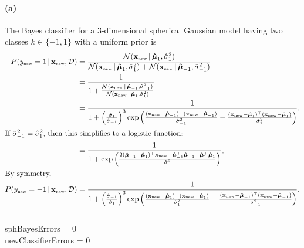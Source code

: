 \documentclass[a4paper,11pt]{article}
\DeclareMathOperator{\given}{\mid}
\begin{document}
\paragraph{(a)}
The Bayes classifier for a 3-dimensional spherical Gaussian model having two classes $k\in\{-1,1\}$ with a uniform prior is
\begin{align*}
  P( y_\mathrm{\scriptscriptstyle{new}}=1
    \given \mathbf{x}_\mathrm{\scriptscriptstyle{new}}, \mathcal{D})
  &=
  \frac{
    \mathcal{N}( \mathbf{x}_\mathrm{\scriptscriptstyle{new}}
      \given \boldsymbol{\hat\mu}_1, \hat\sigma_1^2)
  }{
    \mathcal{N}( \mathbf{x}_\mathrm{\scriptscriptstyle{new}}
      \given \boldsymbol{\hat\mu}_1, \hat\sigma_1^2)
    +
    \mathcal{N}( \mathbf{x}_\mathrm{\scriptscriptstyle{new}}
      \given \boldsymbol{\hat\mu}_{-1}, \hat\sigma_{-1}^2)
  }
  \\
  &=
  \frac{1}{
    1 + \frac{
      \mathcal{N}( \mathbf{x}_\mathrm{\scriptscriptstyle{new}}
        \given \boldsymbol{\hat\mu}_{-1}, \hat\sigma_{-1}^2)
    }{
      \mathcal{N}( \mathbf{x}_\mathrm{\scriptscriptstyle{new}}
        \given \boldsymbol{\hat\mu}_1, \hat\sigma_1^2)
    }
  }
  \\
  &=
  \frac{1}{
    1 + \left(\frac{
    \hat\sigma_1
    }{
    \hat\sigma_{-1}
    }\right)^3
    \exp\left(
      \frac{
        (\mathbf{x}_\mathrm{\scriptscriptstyle{new}}-\boldsymbol{\hat\mu}_{-1})^\top
        (\mathbf{x}_\mathrm{\scriptscriptstyle{new}}-\boldsymbol{\hat\mu}_{-1})
      }{\hat\sigma_{-1}^2}
      -\frac{
        (\mathbf{x}_\mathrm{\scriptscriptstyle{new}}-\boldsymbol{\hat\mu}_{1})^\top
        (\mathbf{x}_\mathrm{\scriptscriptstyle{new}}-\boldsymbol{\hat\mu}_{1})
      }{\hat\sigma_{1}^2}
    \right)
  }.
  \\
\intertext{If $\hat\sigma_{-1}^2=\hat\sigma_{1}^2$, then this simplifies to a logistic function:}
  &=
  \frac{1}{
    1 + \exp\left(
      \frac{
        2(\boldsymbol{\hat\mu}_{-1}-\boldsymbol{\hat\mu}_1)^\top\mathbf{x}_\mathrm{\scriptscriptstyle{new}}
        + \boldsymbol{\hat\mu}_{-1}^\top\boldsymbol{\hat\mu}_{-1}
        - \boldsymbol{\hat\mu}_{1}^\top\boldsymbol{\hat\mu}_{1}
      }{\hat\sigma^2}
    \right)
  },
  \\
\intertext{By symmetry,}
  P( y_\mathrm{\scriptscriptstyle{new}}=-1
    \given \mathbf{x}_\mathrm{\scriptscriptstyle{new}}, \mathcal{D})
  &=
  \frac{1}{
    1 + \left(\frac{
      \hat\sigma_{-1}
    }{
      \hat\sigma_{1}
    }\right)^3
  \exp\left(
    \frac{
      (\mathbf{x}_\mathrm{\scriptscriptstyle{new}}-\boldsymbol{\hat\mu}_{1})^\top
      (\mathbf{x}_\mathrm{\scriptscriptstyle{new}}-\boldsymbol{\hat\mu}_{1})
    }{\hat\sigma_{1}^2}
    -\frac{
      (\mathbf{x}_\mathrm{\scriptscriptstyle{new}}-\boldsymbol{\hat\mu}_{-1})^\top
      (\mathbf{x}_\mathrm{\scriptscriptstyle{new}}-\boldsymbol{\hat\mu}_{-1})
    }{\hat\sigma_{-1}^2}
  \right)
}.
\end{align*}
\\
sphBayesErrors = 0 \\
newClassifierErrors = 0
\end{document}
